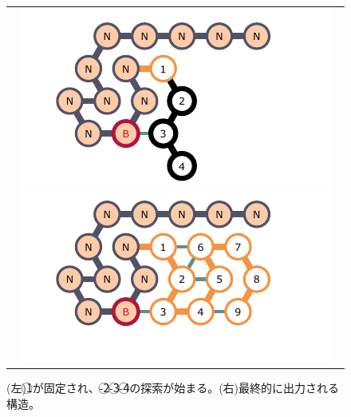 \documentclass[a4,11pt]{article}
\begin{document}
\begin{center}
\begin{figure}[h]
\centering
\begin{tabular}{c}

\begin{minipage}{0.33\hsize}
\centering
	\includegraphics[width=\textwidth]{fig/svg/confex1_3.pdf}
\end{minipage}

\begin{minipage}{0.33\hsize}
\centering
	\includegraphics[width=\textwidth]{fig/svg/confex1_4.pdf}
\end{minipage}

\end{tabular}
\caption{(左)\textcircled{\scriptsize 1}が固定され、{-}\textcircled{\scriptsize 2}{-}\textcircled{\scriptsize 3}{-}\textcircled{\scriptsize 4}の探索が始まる。(右)最終的に出力される構造。}
\label{fig:glider1_02}
\end{figure}
\end{center}
\end{document}
